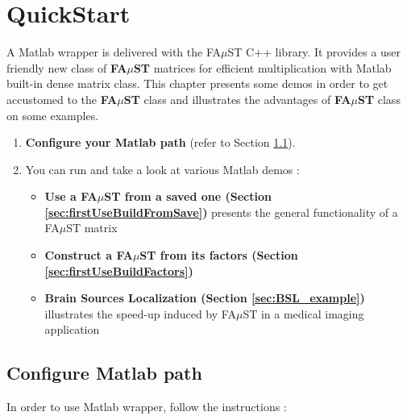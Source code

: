 \chapter{QuickStart}\label{sec:firstUse}

A Matlab wrapper is delivered with the FA$\mu$ST C++ library.
It provides a user friendly new class of \textbf{FA$\mu$ST} matrices for efficient multiplication with Matlab built-in dense matrix class.\newline
This chapter presents some demos in order to get accustomed to the \textbf{FA$\mu$ST} class and illustrates the advantages of \textbf{FA$\mu$ST} class on some examples.  
\begin{enumerate}  
	\item \textbf{Configure your Matlab path} (refer to Section \ref{sec:firstUseMatlabPath}).
	\item You can run and take a look at various Matlab demos :
	\begin{itemize}
		\item \textbf{Use a FA$\mu$ST from a saved one  (Section \ref{sec:firstUseBuildFromSave})} presents the general functionality of a FA$\mu$ST matrix
		\item \textbf{Construct a FA$\mu$ST from its factors (Section \ref{sec:firstUseBuildFactors})}  
		\item \textbf{Brain Sources Localization (Section \ref{sec:BSL_example})}  illustrates the speed-up induced by FA$\mu$ST in a medical imaging application 	
	\end{itemize}
\end{enumerate} 





\section{Configure Matlab path}\label{sec:firstUseMatlabPath}
In order to use Matlab wrapper, follow the instructions :

